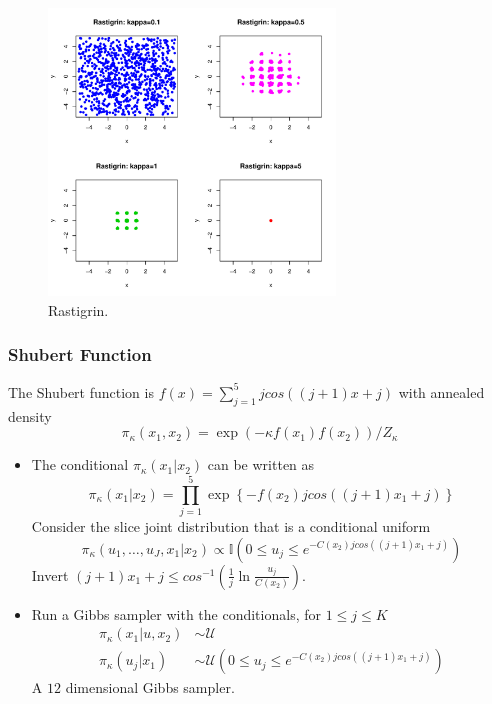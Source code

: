 \documentclass[notes=show,smaller]{beamer}
\begin{document}
\begin{frame}

\begin{figure}[hbp]
\includegraphics[height=3in,width=\textwidth]{john-rastigrin.pdf}
\caption{Rastigrin.}
\end{figure}

\end{frame}
\begin{frame}
\frametitle{Shubert Function}

\footnotesize
The Shubert function is  $ f( x ) = \sum_{j=1}^5 j cos \left ( ( j+1 ) x + j \right ) $ with annealed density
$$
\pi_\kappa ( x_1 , x_2 ) = \exp \left ( - \kappa f( x_1 ) f( x_2 ) \right ) / Z_\kappa
$$
\begin{itemize}
\item
The conditional $ \pi_\kappa ( x_1 | x_2 )$ can be written as
$$
 \pi_\kappa ( x_1 | x_2 ) = \prod_{j=1}^5 \exp \left \{ - f( x_2 ) j cos \left ( (j+1) x_1 + j \right ) \right \}
$$
Consider the slice joint distribution that is a conditional uniform
$$
 \pi_\kappa ( u_1 , \ldots , u_J , x_1 | x_2 ) \propto \mathbb{I}
 \left ( 0 \leq u_j \leq e^{ - C( x_2 ) j cos \left ( (j+1) x_1 + j \right ) } \right )
$$
Invert
$ (j+1) x_1 + j \leq cos^{-1} \left ( \frac{1}{j} \ln \frac{u_j}{C(x_2)} \right ) $.
\item
Run a Gibbs sampler with the conditionals, for $ 1 \leq j \leq K $
\begin{align*}
\pi_\kappa ( x_1 | u , x_2 ) & \sim \mathcal{U} \\
\pi_\kappa ( u_j | x_1  ) & \sim \mathcal{U} \left ( 0 \leq u_j \leq e^{ - C( x_2 ) j cos \left ( (j+1) x_1 + j \right ) } \right )
\end{align*}
A $12$ dimensional Gibbs sampler.
\end{itemize}
\normalsize

\end{frame}
\end{document}
